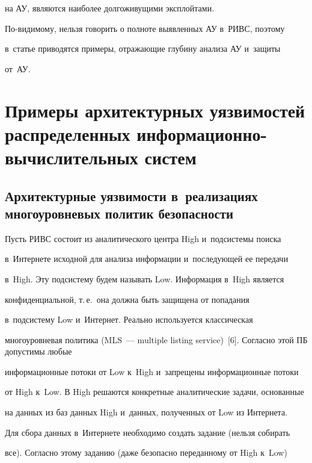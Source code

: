 на АУ, являются наиболее долгоживущими эксплойтами. 


  


  По-видимому, нельзя говорить о полноте выявленных АУ в~РИВС, поэтому 


в~статье приводятся примеры, отражающие глубину анализа АУ и~защиты 


от~АУ. 


  


\section{Примеры архитектурных уязвимостей распределенных информационно-вычислительных систем}





\subsection{Архитектурные уязвимости в~реализациях многоуровневых политик безопасности}


 


  Пусть РИВС состоит из аналитического центра High и~подсистемы поиска 


в~Интернете исходной для анализа информации и~последующей ее передачи 


в~High. Эту подсистему будем называть Low. Информация в~High является 


конфиденциальной, т.\,е.\ она должна быть защищена от попадания 


в~подсистему Low и~Интернет. Реально используется классическая 


многоуровневая политика (MLS~--- multiple listing service)~[6]. Согласно этой ПБ допустимы любые 


информационные потоки от Low к~High и~запрещены информационные потоки 


от High к~Low. В High решаются конкретные аналитические задачи, основанные 


на данных из баз данных High и~данных, полученных от Low из Интернета. 


  


  Для сбора данных в~Интернете необходимо создать задание (нельзя собирать 


все). Согласно этому заданию (даже безопасно переданному от High к~Low) 


